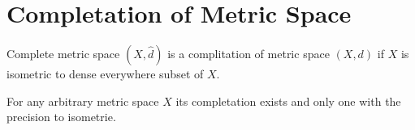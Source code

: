 
\section{Completation of Metric Space}

\begin{definition}
  Complete metric space $(\hat{X}, \hat{d})$ is a complitation of metric space $(X, d)$ if $X$ is isometric to dense everywhere subset of $X$.
\end{definition}

\begin{theorem}
  For any arbitrary metric space $X$ its completation exists and only one with the precision to isometrie.
\end{theorem}

